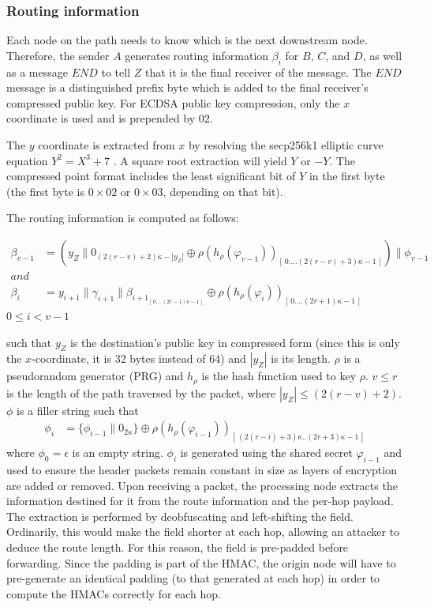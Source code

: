 \subsubsection{Routing information}
Each node on the path needs to know which is the next downstream node. Therefore, the sender $A$ generates routing information $\beta_i$ for $B$, $C$, and $D$, as well as a message $END$ to tell $Z$ that it is the final receiver of the message.  The $END$ message is a distinguished prefix byte which is added to the final receiver's compressed public key. For ECDSA public key compression, only the $x$ coordinate is used and is prepended by $02$. 

The $y$ coordinate is extracted from $x$ by resolving the secp256k1 elliptic curve equation $Y^2=X^3+7$ \cite{secp}. A square root extraction will yield $Y$ or $-Y$. The compressed point format includes the least significant bit of $Y$ in the first byte (the first byte is $0\times02$ or $0\times03$, depending on that bit).

The routing information is computed as follows:

\begin{align}
    \beta_{v-1} & =(y_Z\|0_{(2(r-v)+2)\kappa-|y_Z|}\oplus \rho(h_{\rho}(\varphi_{v-1}))_{[ \,0....(2(r-v)+3)\kappa-1\,]})\|\phi_{v-1}                  \\
    and         & \nonumber                                                                                                                          \\
    \beta_i     & =y_{i+1}\|\gamma_{i+1}\|\beta_{{i+1}_{[ \,0....(2r-1)\kappa-1\,] }}\oplus \rho(h_{\rho}(\varphi_{i}))_{[ \,0....(2r+1)\kappa-1\,]}
    \label{eq:2}
\end{align}
$0\le i < v-1$

such that $y_Z$ is the destination's public key in compressed form (since this is only the $x$-coordinate, it is 32 bytes instead of 64) and $|y_Z|$ is its length. $\rho$ is a pseudorandom generator (PRG) and $h_{\rho}$ is the hash function used to key $\rho$.
$v\leq r$ is the length of the path traversed by the packet, where $|y_Z| \leq (2(r - v) + 2)$. $\phi$ is a filler string such that
\begin{align}
    \phi_i & =\{ \phi_{i-1}\|0_{2\kappa}\}\oplus \rho(h_{\rho}(\varphi_{i-1}))_{[ \,(2(r-i)+3)\kappa..(2r+3)\kappa-1\,]}
\end{align}
where $\phi_0=\epsilon$ is an empty string. $\phi_i$ is generated using the shared secret $\varphi_{i-1}$ and used to ensure the header packets remain constant in size as layers of encryption are added or removed. Upon receiving a packet, the processing node extracts the information destined for it from the route information and the per-hop payload. The extraction is performed by deobfuscating and left-shifting the field. Ordinarily, this would make the field shorter at each hop, allowing an attacker to deduce the route length. For this reason, the field is pre-padded before forwarding. Since the padding is part of the HMAC, the origin node will have to pre-generate an identical padding (to that generated at each hop) in order to compute the HMACs correctly for each hop.


